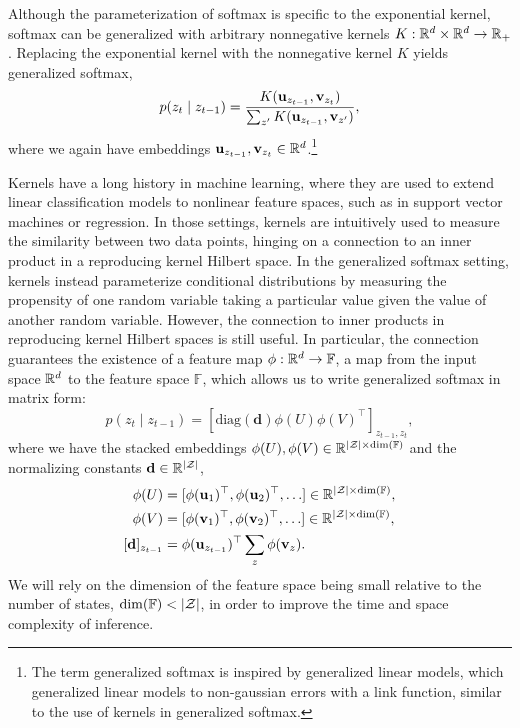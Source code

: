 \documentclass{article}
\begin{document}
Although the parameterization of softmax is specific to the exponential kernel,
softmax can be generalized with arbitrary nonnegative kernels $K: \mathbb{R}^d\times\mathbb{R}^d\to\mathbb{R}_+$.
Replacing the exponential kernel with the nonnegative kernel $K$ yields 
generalized softmax,
\begin{equation}
\label{eqn:gensoftmax}
p(z_t \mid z_{t-1}) = \frac{K(\mathbf{u}_{z_{t-1}}, \mathbf{v}_{z_t})}{\sum_{z'} K(\mathbf{u}_{z_{t-1}}, \mathbf{v}_{z'})},
\end{equation}
where we again have embeddings $\mathbf{u}_{z_{t-1}},\mathbf{v}_{z_t}\in\mathbb{R}^d$.\footnote{
The term generalized softmax is inspired by generalized linear models,
which generalized linear models to non-gaussian errors with a link function,
similar to the use of kernels in generalized softmax.
}

Kernels have a long history in machine learning,
where they are used to extend linear classification models to nonlinear feature spaces,
such as in support vector machines or regression.
In those settings, kernels are intuitively used to measure the similarity between two data points,
hinging on a connection to an inner product in a reproducing kernel Hilbert space.
In the generalized softmax setting, kernels instead parameterize conditional distributions by
measuring the propensity of one random variable taking a particular value given
the value of another random variable.
However, the connection to inner products in reproducing kernel Hilbert spaces 
is still useful.
In particular, the connection guarantees the existence of a feature map $\phi:\mathbb{R}^d\to\mathbb{F}$,
a map from the input space $\mathbb{R}^d$ to the feature space $\mathbb{F}$,
which allows us to write generalized softmax in matrix form:
\begin{equation}
\label{eqn:gentrans}
p(z_t \mid z_{t-1}) = [\textrm{diag}(\mathbf{d})\phi(U)\phi(V)^\top]_{z_{t-1},z_t},
\end{equation}
where we have the stacked embeddings $\phi(U),\phi(V)\in\mathbb{R}^{|\mathcal{Z}|\times\dim(\mathbb{F})}$
and the normalizing constants $\mathbf{d}\in\mathbb{R}^{|\mathcal{Z}|}$,
\begin{align*}
\phi(U) &= [\phi(\mathbf{u}_1)^\top, \phi(\mathbf{u}_2)^\top, \ldots] \in\mathbb{R}^{|\mathcal{Z}|\times \dim(\mathbb{F})},\\
\phi(V) &= [\phi(\mathbf{v}_1)^\top, \phi(\mathbf{v}_2)^\top, \ldots]\in\mathbb{R}^{|\mathcal{Z}|\times \dim(\mathbb{F})},\\
[\mathbf{d}]_{z_{t-1}} &= \phi(\mathbf{u}_{z_{t-1}})^\top \sum_z\phi(\mathbf{v}_z).
\end{align*}
We will rely on the dimension of the feature space being small 
relative to the number of states, $\dim(\mathbb{F}) < |\mathcal{Z}|$,
in order to improve the time and space complexity of inference.
\end{document}
